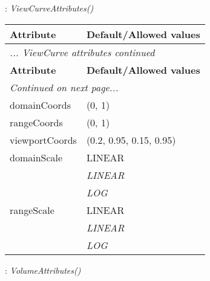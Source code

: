 \documentclass[10pt,a4paper]{report}
\begin{document}
\newpage

{}
: {\it ViewCurveAttributes() }\\[-3mm]

\begin{longtable}{ll}
{\bf Attribute} & {\bf Default/Allowed values} \\
\hline \hline
\endfirsthead
\multicolumn{2}{l}{{\it ... ViewCurve attributes continued}} \\
{\bf Attribute} & {\bf Default/Allowed values} \\
\hline \hline
\endhead
\hline
\multicolumn{2}{l}{{\it Continued on next page...}} \\
\endfoot
\hline
\endlastfoot

domainCoords  &  (0, 1) \\
rangeCoords  &  (0, 1) \\
viewportCoords  &  (0.2, 0.95, 0.15, 0.95) \\
domainScale  &  LINEAR   \\
 & {\it  LINEAR} \\
 & {\it  LOG} \\
rangeScale  &  LINEAR   \\
 & {\it  LINEAR} \\
 & {\it  LOG} \\
\end{longtable}

\newpage

{}
: {\it VolumeAttributes() }\\[-3mm]
\end{document}

